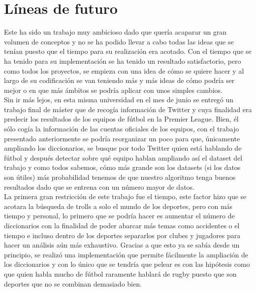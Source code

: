 \documentclass[../all.tex]{subfiles}
\begin{document}
\section{Líneas de futuro} 


Este ha sido un trabajo muy ambicioso dado que quería acaparar un gran volumen de conceptos y no se ha podido llevar a cabo todas las ideas que se tenían puesto que el tiempo para su realización era acotado. Con el tiempo que se ha tenido para su implementación se ha tenido un resultado satisfactorio, pero como todos los proyectos, se empieza con una idea de cómo se quiere hacer y al largo de su codificación se van teniendo más y más ideas de cómo podría ser mejor o en que más ámbitos se podría aplicar con unos simples cambios.\\

Sin ir más lejos, en esta misma universidad en el mes de junio se entregó un trabajo final de máster que de recogía información de Twitter y cuya finalidad era predecir los resultados de los equipos de fútbol en la Premier League. Bien, él sólo cogía la información de las cuentas oficiales de los equipos,  con el trabajo presentado anteriormente se podría reorganizar un poco para que, únicamente ampliando los diccionarios, se busque por todo Twitter quien está hablando de fútbol y después detectar sobre qué equipo hablan ampliando así el dataset del trabajo y como todos sabemos, cómo más grande son los datasets (si los datos son útiles) más probabilidad tenemos de que nuestro algoritmo tenga buenos resultados dado que se entrena con un número mayor de datos.\\

La primera gran restricción de este trabajo fue el tiempo, este factor hizo que se acotara la búsqueda de trolls a solo el mundo de los deportes, pero con más tiempo y personal, lo primero que se podría hacer es aumentar el número de diccionarios con la finalidad de poder abarcar más temas como accidentes o el tiempo e incluso dentro de los deportes separarlos por clubes y jugadores para hacer un análisis aún más exhaustivo. Gracias a que esto ya se sabía desde un principio, se realizó una implementación que permite fácilmente la ampliación de los diccionarios y con lo único que se tendría que pelear es con las hipótesis como que quien habla mucho de fútbol raramente hablará de rugby puesto que son deportes que no se combinan demasiado bien.\\
\end{document}
